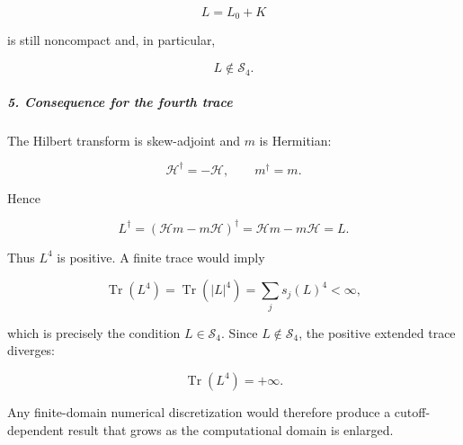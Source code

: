 \[
L=L_0+K
\]

is still noncompact and, in particular,

\[
L\notin\mathcal S_4.
\]

\subparagraph*{5. Consequence for the fourth trace}

The Hilbert transform is skew-adjoint and $m$ is Hermitian:

\[
\mathcal H^\dagger=-\mathcal H, \qquad m^\dagger=m.
\]

Hence

\[
L^\dagger =(\mathcal Hm-m\mathcal H)^\dagger =\mathcal Hm-m\mathcal H =L.
\]

Thus $L^4$ is positive. A finite trace would imply

\[
\operatorname{Tr}(L^4) = \operatorname{Tr}(|L|^4) = \sum_j s_j(L)^4<\infty,
\]

which is precisely the condition $L\in\mathcal S_4$. Since $L\notin\mathcal S_4$, the positive extended trace diverges:

\[
\operatorname{Tr}(L^4)=+\infty.
\]

Any finite-domain numerical discretization would therefore produce a cutoff-dependent result that grows as the computational domain is enlarged.
